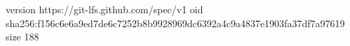 version https://git-lfs.github.com/spec/v1
oid sha256:f156c6e6a9ed7de6c7252b8b9928969dc6392a4c9a4837e1903fa37df7a97619
size 188

